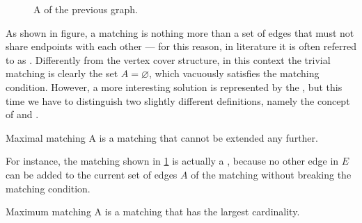 \documentclass[a4paper, 12pt]{report}
\begin{document}
    \begin{figure}[H]
        \centering
        \caption{A  of the previous graph.}
        \label{matching}
    \end{figure}

    As shown in figure, a matching is nothing more than a set of edges that must not share endpoints with each other --- for this reason, in literature it is often referred to as . Differently from the vertex cover structure, in this context the trivial matching is clearly the set $A = \varnothing$, which vacuously satisfies the matching condition. However, a more interesting solution is represented by the , but this time we have to distinguish two slightly different definitions, namely the concept of  and .

    \begin{frameddefn}{Maximal matching}
        A  is a matching that cannot be extended any further.
    \end{frameddefn}
    
    For instance, the matching shown in \cref{matching} is actually a , because no other edge in $E$ can be added to the current set of edges $A$ of the matching without breaking the matching condition.

    \begin{frameddefn}{Maximum matching}
        A  is a matching that has the largest cardinality.
    \end{frameddefn}
    
\end{document}
